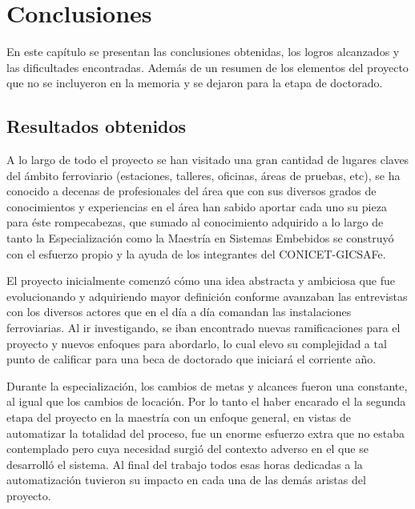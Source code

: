 
\chapter{Conclusiones} %

\label{Chapter5} %


En este capítulo se presentan las conclusiones obtenidas, los logros alcanzados y las dificultades encontradas. Además de un resumen de los elementos del proyecto que no se incluyeron en la memoria y se dejaron para la etapa de doctorado.


\section{Resultados obtenidos}
	
	A lo largo de todo el proyecto se han visitado una gran cantidad de lugares claves del ámbito ferroviario (estaciones, talleres, oficinas, áreas de pruebas, etc), se ha conocido a decenas de profesionales del área que con sus diversos grados de conocimientos y experiencias en el área han sabido aportar cada uno su pieza para éste rompecabezas, que sumado al conocimiento adquirido a lo largo de tanto la Especialización como la Maestría en Sistemas Embebidos se construyó con el esfuerzo propio y la ayuda de los integrantes del CONICET-GICSAFe.
	
	El proyecto inicialmente comenzó cómo una idea abstracta y ambiciosa que fue evolucionando y adquiriendo mayor definición conforme avanzaban las entrevistas con los diversos actores que en el día a día comandan las instalaciones ferroviarias. Al ir investigando, se iban encontrado nuevas ramificaciones para el proyecto y nuevos enfoques para abordarlo, lo cual elevo su complejidad a tal punto de calificar para una beca de doctorado que iniciará el corriente año.
	
	Durante la especialización, los cambios de metas y alcances fueron una constante, al igual que los cambios de locación. Por lo tanto el haber encarado el la segunda etapa del proyecto en la maestría con un enfoque general, en vistas de automatizar la totalidad del proceso, fue un enorme esfuerzo extra que no estaba contemplado pero cuya necesidad surgió del contexto adverso en el que se desarrolló el sistema. Al final del trabajo todos esas horas dedicadas a la automatización tuvieron su impacto en cada una de las demás aristas del proyecto.
		
